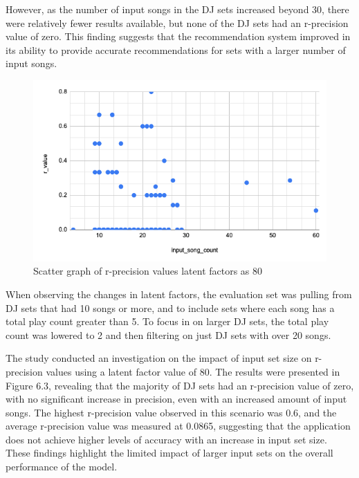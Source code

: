 However, as the number of input songs in the DJ sets increased beyond 30, there were relatively fewer results available, but none of the DJ sets had an r-precision value of zero. This finding suggests that the recommendation system improved in its ability to provide accurate recommendations for sets with a larger number of input songs.

\begin{figure}[H]
	\includegraphics[scale=0.6]{images/80_little_sets}
	\centering
	\caption{Scatter graph of r-precision values latent factors as 80} 
\end{figure}


When observing the changes in latent factors, the evaluation set was pulling from DJ sets that had 10 songs or more, and to include sets where each song has a total play count greater than 5. To  focus in on larger DJ sets, the total play count was lowered to 2 and then filtering on just DJ sets with over 20 songs.

The study conducted an investigation on the impact of input set size on r-precision values using a latent factor value of 80. The results were presented in Figure 6.3, revealing that the majority of DJ sets had an r-precision value of zero, with no significant increase in precision, even with an increased amount of input songs. The highest r-precision value observed in this scenario was 0.6, and the average r-precision value was measured at 0.0865, suggesting that the application does not achieve higher levels of accuracy with an increase in input set size. These findings highlight the limited impact of larger input sets on the overall performance of the model.


